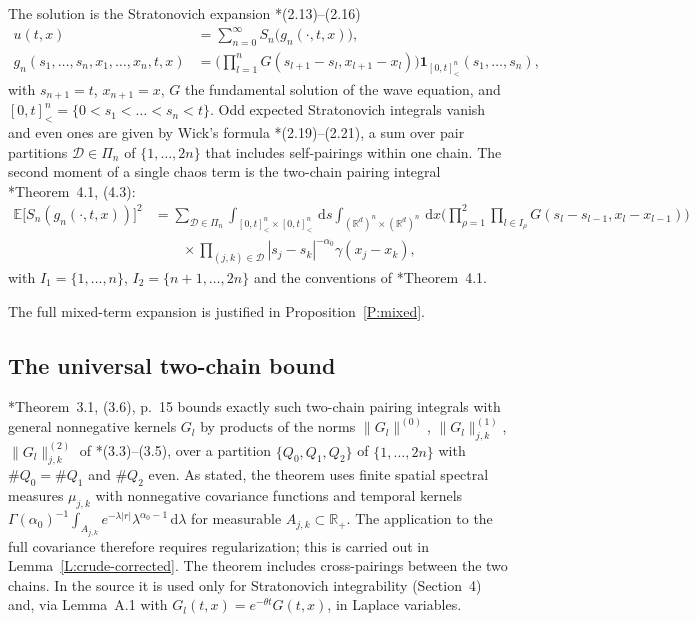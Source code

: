 \documentclass[12pt]{article}
\numberwithin{equation}{section}
\theoremstyle{definition}
\newcommand{\R}{\mathbb{R}}
\newcommand{\E}{\mathbb{E}}
\newcommand{\ud}{\,\mathrm{d}}
\begin{document}
The solution is the Stratonovich expansion
\cite{chen:author2026:time-dependency}*{(2.13)--(2.16)}
\begin{equation}\label{E:expansion}
  \begin{split}
    u(t,x)&=\sum_{n=0}^\infty S_n\big(g_n(\cdot,t,x)\big),\\
    g_n(s_1,\dots,s_n,x_1,\dots,x_n,t,x)
    &=\Big(\prod_{l=1}^nG(s_{l+1}-s_l,x_{l+1}-x_l)\Big)
    \mathbf 1_{[0,t]^n_<}(s_1,\dots,s_n),
  \end{split}
\end{equation}
with $s_{n+1}=t$, $x_{n+1}=x$, $G$ the fundamental solution of the wave
equation, and $[0,t]^n_<=\{0<s_1<\dots<s_n<t\}$. Odd expected Stratonovich
integrals vanish and even ones are given by Wick's formula
\cite{chen:author2026:time-dependency}*{(2.19)--(2.21)}, a sum over pair
partitions $\mathcal D\in\Pi_n$ of $\{1,\dots,2n\}$ that includes
self-pairings within one chain. The second moment of a single chaos term is
the two-chain pairing integral \cite{chen:author2026:time-dependency}*{Theorem~4.1, (4.3)}:
\begin{equation}\label{E:Sn2}
  \begin{split}
    \E\big[S_n(g_n(\cdot,t,x))\big]^2
    &=\sum_{\mathcal D\in\Pi_n}\int_{[0,t]^n_<\times[0,t]^n_<}\ud s
    \int_{(\R^d)^n\times(\R^d)^n}\ud x
    \Big(\prod_{\rho=1}^2\prod_{l\in I_\rho}G(s_l-s_{l-1},x_l-x_{l-1})\Big)\\
    &\qquad\times\prod_{(j,k)\in\mathcal D}|s_j-s_k|^{-\alpha_0}\gamma(x_j-x_k),
  \end{split}
\end{equation}
with $I_1=\{1,\dots,n\}$, $I_2=\{n+1,\dots,2n\}$ and the conventions of
\cite{chen:author2026:time-dependency}*{Theorem~4.1}.

The full mixed-term expansion is justified in Proposition~\ref{P:mixed}.

\subsection{The universal two-chain bound}

\cite{chen:author2026:time-dependency}*{Theorem~3.1, (3.6), p.~15} bounds
exactly such two-chain pairing integrals with general nonnegative kernels
$G_l$ by products of the norms $\|G_l\|^{(0)}$, $\|G_l\|^{(1)}_{j,k}$,
$\|G_l\|^{(2)}_{j,k}$ of \cite{chen:author2026:time-dependency}*{(3.3)--(3.5)},
over a partition $\{Q_0,Q_1,Q_2\}$ of $\{1,\dots,2n\}$ with $\#Q_0=\#Q_1$ and
$\#Q_2$ even. As stated, the theorem uses finite spatial spectral measures
$\mu_{j,k}$ with nonnegative covariance functions and temporal kernels
$\Gamma(\alpha_0)^{-1}\int_{A_{j,k}}e^{-\lambda|r|}
\lambda^{\alpha_0-1}\ud\lambda$ for measurable $A_{j,k}\subset\R_+$.
The application to the full covariance therefore requires regularization;
this is carried out in Lemma~\ref{L:crude-corrected}.
The theorem includes cross-pairings between the two chains. In the
source it is used only for Stratonovich integrability (Section~4) and, via
Lemma~A.1 with $G_l(t,x)=e^{-\theta t}G(t,x)$, in Laplace variables.
\end{document}
